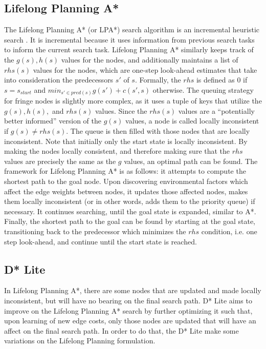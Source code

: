 	\subsection{Lifelong Planning A*}
	    The Lifelong Planning A* (or LPA*) search algorithm is an incremental heuristic search
	    \cite{koenig2002d} \cite{koenig2002improved}. It is incremental because it uses information from previous search tasks to inform the current search task. Lifelong Planning A* similarly keeps track of the $g(s),h(s)$ values for the nodes, and additionally maintains a list of $rhs(s)$ values for the nodes, which are one-step look-ahead estimates that take into consideration the predecessors $s'$ of $s$. Formally, the $rhs$ is defined as 0 if $s=s_{start}$ and $min_{s'\in pred(s)} g(s')+c(s',s)$ otherwise. The queuing strategy for fringe nodes is slightly more complex, as it uses a tuple of keys that utilize the $g(s),h(s),$ and $rhs(s)$ values. Since the $rhs(s)$ values are a ``potentially better informed'' version of the $g(s)$ values, a node is called locally inconsistent if $g(s) \neq rhs(s)$. The queue is then filled with those nodes that are locally inconsistent. Note that initially only the start state is locally inconsistent. By making the nodes locally consistent, and therefore making sure that the $rhs$ values are precisely the same as the $g$ values, an optimal path can be found. 
		The framework for Lifelong Planning A* is as follows: it attempts to compute the shortest path to the goal node. Upon discovering environmental factors which affect the edge weights between nodes, it updates those affected nodes, makes them locally inconsistent (or in other words, adds them to the priority queue) if necessary. It continues searching, until the goal state is expanded, similar to A*. Finally, the shortest path to the goal can be found by starting at the goal state, transitioning back to the predecessor which minimizes the $rhs$ condition, i.e. one step look-ahead, and continue until the start state is reached.  
	
	\subsection{D* Lite}
	In Lifelong Planning A*, there are some nodes that are updated and made locally inconsistent, but will have no bearing on the final search path. D* Lite \cite{koenig2004lifelong} \cite{simmons1995probabilistic} aims to improve on the Lifelong Planning A* search by further optimizing it such that, upon learning of new edge costs, only those nodes are updated that will have an affect on the final search path. In order to do that, the D* Lite make some variations on the Lifelong Planning formulation. 
	
